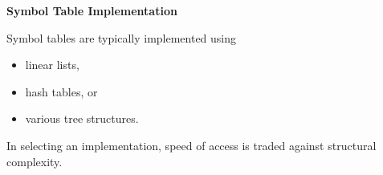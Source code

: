 %
%
\begin{slide}{}
{\bf Symbol Table Implementation}

Symbol tables are typically implemented using
\begin{itemize}
\item linear lists,
\item hash tables, or
\item various tree structures.
\end{itemize}

In selecting an implementation, speed of access is traded
against structural complexity.

\end{slide}


